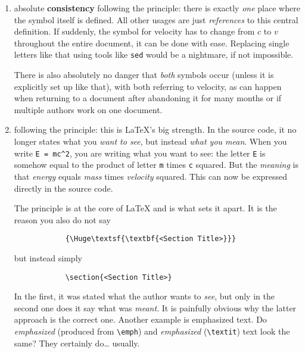 \begin{enumerate}
    \item absolute \textbf{consistency} following the 
          principle:
          there is exactly \emph{one} place where the symbol itself is defined.
          All other usages are just \emph{references} to this central definition.
          If suddenly, the symbol for velocity has to change from \(c\) to \(v\)
          throughout the entire document, it can be done with ease.
          Replacing single letters like that using tools like \texttt{sed} would be a
          nightmare, if not impossible.

          There is also absolutely no danger that \emph{both} symbols occur (unless
          it is explicitly set up like that), with both referring to velocity,
          as can happen when returning to a document after abandoning it for many months
          or if multiple authors work on one document.
    \item following the \textbf{} principle:
          this is \LaTeX{}'s big strength.
          In the source code, it no longer states what you \emph{want to see}, but
          instead \emph{what you mean}.
          When you write \verb|E = mc^2|, you are writing what you want to see:
          the letter \texttt{E} is somehow equal to the product of letter \texttt{m}
          times \texttt{c} squared.
          But the \emph{meaning} is that \emph{energy} equals \emph{mass} times
          \emph{velocity} squared.
          This can now be expressed directly in the source code.

          The  principle is at the core of \LaTeX{}
          and is what sets it apart.
          It is the reason you also do not say
          \begin{verbatim}
            {\Huge\textsf{\textbf{<Section Title>}}}
        \end{verbatim}
          but instead simply
          \begin{verbatim}
            \section{<Section Title>}
        \end{verbatim}
          In the first, it was stated what the author wants to \emph{see}, but only
          in the second one does it say what was \emph{meant}.
          It is painfully obvious why the latter approach is the correct one.
          Another example is emphasized text.
          Do \emph{emphasized} (produced from \verb|\emph|) and \textit{emphasized}
          (\verb|\textit|) text look the same?
          They certainly do\dots{} usually.


\end{enumerate}
